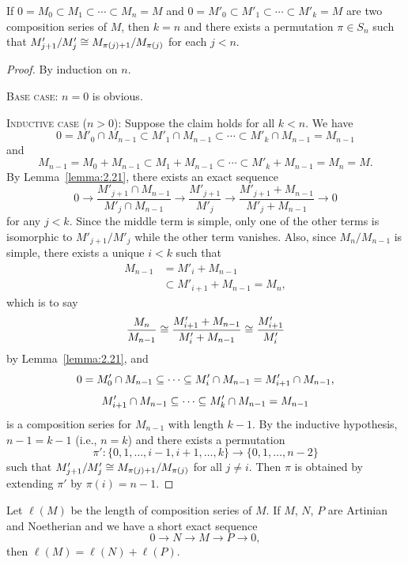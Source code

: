 \begin{theorem}\label{thm:2.24}
If $0=M_{0}\subset M_{1}\subset\cdots\subset M_{n}=M$ and
$0=M'_{0}\subset M'_{1}\subset\cdots\subset M'_{k}=M$ are two
composition series of $M$, then $k=n$ and there exists a permutation $\pi\in S_{n}$
such that $M'_{j+1}/M'_{j}\cong M_{\pi(j)+1}/M_{\pi(j)}$ for each $j<n$.
\end{theorem}

\begin{proof}
By induction on $n$.

\textsc{Base case}: $n=0$ is obvious.

\textsc{Inductive case} ($n>0$): Suppose the claim holds for all
$k<n$. We have 
\begin{equation}
0=M'_{0}\cap M_{n-1}\subset M'_{1}\cap M_{n-1}\subset\cdots\subset
M'_{k}\cap M_{n-1}=M_{n-1}
\end{equation}
and
\begin{equation}
M_{n-1}=M_{0}+M_{n-1}\subset M_{1}+M_{n-1}\subset\cdots\subset M'_{k}+M_{n-1}=M_{n}=M.
\end{equation}
By Lemma~\ref{lemma:2.21}, there exists an exact sequence
\begin{equation}
0\to\frac{M'_{j+1}\cap M_{n-1}}{M'_{j}\cap M_{n-1}}\to \frac{M'_{j+1}}{M'_{j}}\to\frac{M'_{j+1}+M_{n-1}}{M'_{j}+M_{n-1}}\to0
\end{equation}
for any $j<k$. Since the middle term is simple, only one of the other
terms is isomorphic to $M'_{j+1}/M'_{j}$ while the other term
vanishes. Also, since $M_{n}/M_{n-1}$ is simple, there exists a unique
$i<k$ such that
\begin{subequations}
  \begin{align}
M_{n-1} &= M'_{i}+M_{n-1}\\
&\subset M'_{i+1}+M_{n-1}=M_{n},
  \end{align}
\end{subequations}
which is to say
\begin{equation}
\frac{M_{n}}{M_{n-1}}\cong\frac{M'_{i+1}+M_{n-1}}{M'_{i}+M_{n-1}}\cong\frac{M'_{i+1}}{M'_{i}}
\end{equation}
by Lemma~\ref{lemma:2.21}, and
\begin{equation}
0=M'_{0}\cap M_{n-1}\propersubset\cdots\propersubset M'_{i}\cap
M_{n-1}=M'_{i+1}\cap M_{n-1},
\end{equation}
\begin{equation}
M'_{i+1}\cap M_{n-1}\propersubset\cdots\propersubset M'_{k}\cap M_{n-1}=M_{n-1}
\end{equation}
is a composition series for $M_{n-1}$ with length $k-1$. By the
inductive hypothesis, $n-1=k-1$ (i.e., $n=k$) and there exists a
permutation
\begin{equation}
\pi'\colon\{0,1,\dots,i-1,i+1,\dots,k\}\to\{0,1,\dots,n-2\}
\end{equation}
such that $M'_{j+1}/M'_{j}\cong M_{\pi(j)+1}/M_{\pi(j)}$ for all $j\neq i$.
Then $\pi$ is obtained by extending $\pi'$ by $\pi(i)=n-1$.
\end{proof}

\begin{corollary}\label{cor:2.25}
Let $\ell(M)$ be the length of composition series of $M$. If $M$, $N$,
$P$ are Artinian and Noetherian and we have a short exact sequence
\begin{equation}
0\to N\to M\to P\to 0,
\end{equation}
then $\ell(M)=\ell(N)+\ell(P)$.
\end{corollary}